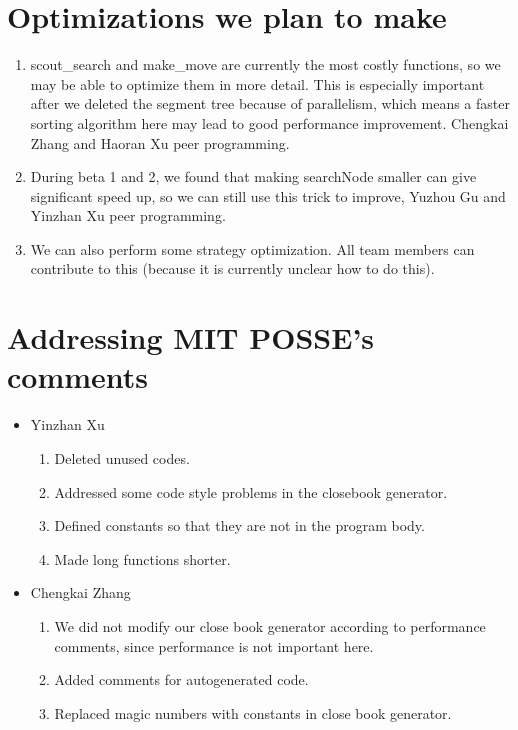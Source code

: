 \documentclass[10pt,twosidep]{article}
\begin{document}
\section{Optimizations we plan to make}

\begin{enumerate}
  \item scout\_search and make\_move are currently the most costly functions, so we may be able to optimize them in more detail. This is especially important after we deleted the segment tree because of parallelism, which means a faster sorting algorithm here may lead to good performance improvement. Chengkai Zhang and Haoran Xu peer programming.
  \item During beta 1 and 2, we found that making searchNode smaller can give significant speed up, so we can still use this trick to improve, Yuzhou Gu and Yinzhan Xu peer programming.
  \item We can also perform some strategy optimization. All team members can contribute to this (because it is currently unclear how to do this).
\end{enumerate}

\section{Addressing MIT POSSE's comments}

\begin{itemize}
	\item Yinzhan Xu
	
	\begin{enumerate}
		\item Deleted unused codes. 
		\item Addressed some code style problems in the closebook generator. 
		\item Defined constants so that they are not in the program body. 
		\item Made long functions shorter. 
	\end{enumerate}

    \item Chengkai Zhang

    \begin{enumerate}
        \item We did not modify our close book generator according to performance comments, since performance is not important here.
        \item Added comments for autogenerated code.
        \item Replaced magic numbers with constants in close book generator.
    \end{enumerate}
\end{itemize}
\end{document}
